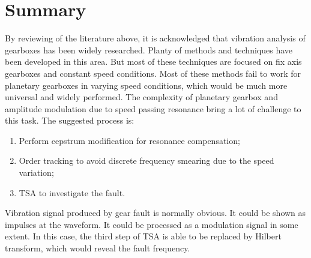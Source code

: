 \section{Summary}

By reviewing of the literature above, it is acknowledged that vibration analysis of gearboxes has been widely researched. Planty of methods and techniques have been developed in this area. But most of these techniques are focused on fix axis gearboxes and constant speed conditions. Most of these methods fail to work for planetary gearboxes in varying speed conditions, which would be much more universal and widely performed. The complexity of planetary gearbox and amplitude modulation due to speed passing resonance bring a lot of challenge to this task. The suggested process is:

\begin{enumerate}
	\item Perform cepstrum modification for resonance compensation;
	
	\item Order tracking to avoid discrete frequency smearing due to the speed variation;
	
	\item TSA to investigate the fault.
	
\end{enumerate}

Vibration signal produced by gear fault is normally obvious. It could be shown as impulses at the waveform. It could be processed as a modulation signal in some extent. In this case, the third step of TSA is able to be replaced by Hilbert transform, which would reveal the fault frequency.











